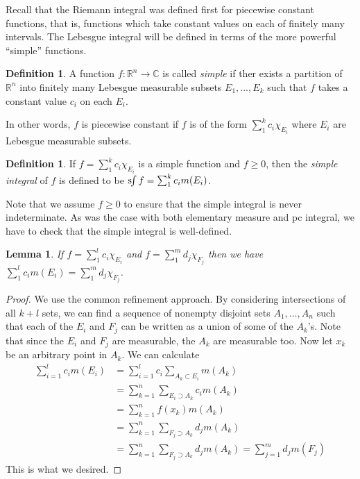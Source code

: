 \documentclass[11pt,oneside]{amsbook}
\newcommand{\RR}{{\mathbb R}}
\newcommand{\CC}{{\mathbb C}}
\newcommand{\sint}{\text{s}\kern-3pt\int}
\theoremstyle{definition}
\theoremstyle{plain}
\newtheorem{lem}[thm]{Lemma}
\theoremstyle{definition}
\newtheorem{defn}[thm]{Definition}
\theoremstyle{remark}
\numberwithin{equation}{section}
\numberwithin{figure}{section}
\begin{document}
Recall that the Riemann integral was defined first for piecewise constant functions, that is, functions which take constant values on each of finitely many intervals. The Lebesgue integral will be defined in terms of the more powerful ``simple'' functions.

\begin{defn}
  A function $f\colon\RR^n\to\CC$ is called \emph{simple} if ther exists a partition of $\RR^n$ into finitely many Lebesgue measurable subsets $E_1,\ldots,E_k$ such that $f$ takes a constant value $c_i$ on each $E_i$.
\end{defn}

In other words, $f$ is piecewise constant if $f$ is of the form $\sum_1^kc_i\chi_{E_i}$ where $E_i$ are Lebesgue measurable subsets.

\begin{defn}
  If $f=\sum_1^kc_i\chi_{E_i}$ is a simple function and $f\geq0$, then the \emph{simple integral} of $f$ is defined to be $\sint f=\sum_1^kc_im(E_i)$.
\end{defn}

Note that we assume $f\geq0$ to ensure that the simple integral is never indeterminate. As was the case with both elementary measure and pc integral, we have to check that the simple integral is well-defined.


\begin{lem}
  If $f=\sum_1^lc_i\chi_{E_i}$ and $f=\sum_1^md_j\chi_{F_j}$ then we have $\sum_1^lc_im(E_i)=\sum_1^md_j\chi_{F_j}$.
\end{lem}

\begin{proof}
  We use the common refinement approach. By considering intersections of all $k+l$ sets, we can find a sequence of nonempty disjoint sets $A_1,\ldots,A_n$ such that each of the $E_i$ and $F_j$ can be written as a union of some of the $A_k$'s. Note that since the $E_i$ and $F_j$ are measurable, the $A_k$ are measurable too. Now let $x_k$ be an arbitrary point in $A_k$. We can calculate
  \begin{align*}
    \sum_{i=1}^lc_im(E_i)
    &=\sum_{i=1}^lc_i\sum_{A_k\subset E_i}m(A_k)\\
    &=\sum_{k=1}^n\sum_{E_i\supset A_k}c_im(A_k)\\
    &=\sum_{k=1}^nf(x_k)m(A_k)\\
    &=\sum_{k=1}^n\sum_{F_j\supset A_k}d_jm(A_k)\\
    &=\sum_{k=1}^n\sum_{F_j\supset A_k}d_jm(A_k)=\sum_{j=1}^md_jm(F_j)
  \end{align*}
  This is what we desired.
\end{proof}
\end{document}
